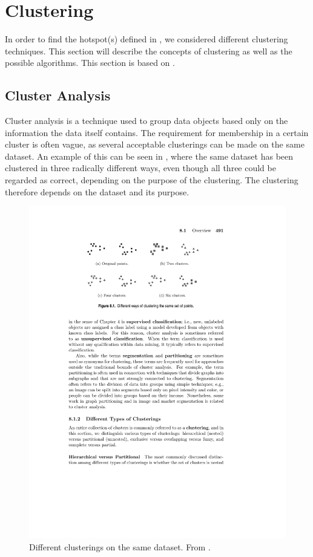 \section{Clustering}\label{clustering}
In order to find the hotspot(s) defined in , we considered different clustering techniques.
This section will describe the concepts of clustering as well as the possible algorithms.
This section is based on \citet{pang2006introduction}.

\subsection{Cluster Analysis}
Cluster analysis is a technique used to group data objects based only on the information the data itself contains.
The requirement for membership in a certain cluster is often vague, as several acceptable clusterings can be made on the same dataset.
An example of this can be seen in , where the same dataset has been clustered in three radically different ways, even though all three could be regarded as correct, depending on the purpose of the clustering.
The clustering therefore depends on the dataset and its purpose.

\begin{figure}[H]
\includegraphics[trim= 3.1cm 19.91cm 5cm 2.5cm, clip=true]{graphics/different_clusters}
\centering
\caption{Different clusterings on the same dataset. From \citet{pang2006introduction}.}
\label{clusterings}
\end{figure}

